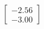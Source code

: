 \documentclass[preview]{standalone}
\begin{document}
\begin{align*}
\begin{bmatrix} -2.56 \\ -3.00 \end{bmatrix}
\end{align*}
\end{document}
